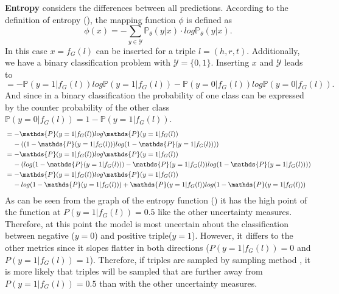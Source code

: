 \textbf{Entropy} 
considers the differences between all predictions.
According to the definition of entropy (), the mapping function $\phi$ is defined as
\begin{equation}
    \phi(x) = - \sum_{y \in \mathcal{Y}}{\mathds{P}_{\theta}(y | x) \cdot log \mathds{P}_{\theta}(y | x)}.
\end{equation}
In this case $x = f_G(l)$ can be inserted for a triple $l = (h,r,t)$.
Additionally, we have a binary classification problem with $\mathcal{Y} = \{0,1\}$.
Inserting $x$ and $\mathcal{Y}$ leads to
\begin{equation}
= - \mathds{P}(y = 1| f_G(l)) log \mathds{P}(y = 1 | f_G(l))
- \mathds{P}(y = 0| f_G(l)) log \mathds{P}(y = 0 | f_G(l)).
\end{equation}
And since in a binary classification the probability of one class can be expressed by the counter probability of the other class 
$\mathds{P}(y = 0| f_G(l)) = 1 - \mathds{P}(y = 1 | f_G(l))$.
\begin{align*} 
&= - \mathds{P}(y = 1| f_G(l)) log \mathds{P}(y = 1 | f_G(l))\\
  &\hspace{4mm}- ((1 - \mathds{P}(y = 1 | f_G(l))) log(1 - \mathds{P}(y = 1 | f_G(l)))) \\
&= - \mathds{P}(y = 1| f_G(l)) log \mathds{P}(y = 1 | f_G(l)) \\
   &\hspace{4mm}- (log(1 - \mathds{P}(y = 1 | f_G(l))) - \mathds{P}(y = 1 | f_G(l)) log(1 - \mathds{P}(y = 1 | f_G(l)))) \\
&= - \mathds{P}(y = 1| f_G(l)) log \mathds{P}(y = 1 | f_G(l)) \\
   &\hspace{4mm}- log(1 - \mathds{P}(y = 1 | f_G(l))) + \mathds{P}(y = 1 | f_G(l)) log(1 - \mathds{P}(y = 1 | f_G(l))) 
\end{align*}
As can be seen from the graph of the entropy function () it has the high point of the function at $P(y = 1 | f_G(l)) = 0.5$ like the other uncertainty measures.
Therefore, at this point the model is most uncertain about the classification between negative ($y = 0$) and positive triple($y = 1$).
However, it differs to the other metrics since it slopes flatter in both directions ($P(y = 1 | f_G(l)) = 0$ and $P(y = 1 | f_G(l)) = 1$).
Therefore, if triples are sampled by sampling method \ussoftmax, it is more likely that triples will be sampled that are further away from $P(y = 1 | f_G(l)) = 0.5$ than with the other uncertainty measures.

